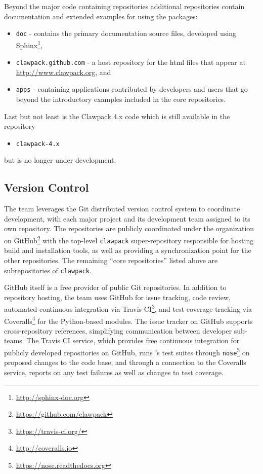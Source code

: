 Beyond the major code containing repositories additional repositories contain
documentation and extended examples for using the packages:
\begin{itemize}
    \item \texttt{doc} - contains the primary documentation source files,
    developed using
Sphinx\footnote{\url{http://sphinx-doc.org}},
    \item \texttt{clawpack.github.com} - a host repository for the html files
    that appear at \url{http://www.clawpack.org}, and
    \item \texttt{apps} - containing applications contributed by developers and
    users that go beyond the introductory examples included in the core
    repositories.
\end{itemize}
Last but not least is the Clawpack 4.x code which is still available in the
repository
\begin{itemize}
    \item \texttt{clawpack-4.x}
\end{itemize}
but is no longer under development.


\subsection{Version Control}

The \clawpack team leverages the Git distributed version control system
to coordinate development, with each major project and its development
team assigned to its own repository.  The repositories are 
publicly coordinated under the \clawpack organization on
GitHub\footnote{\url{https://github.com/clawpack}} with the
top-level \texttt{clawpack} super-repository responsible for hosting
build and installation tools, as well as providing a synchronization
point for the other repositories.  The remaining ``core \clawpack repositories''
listed above are subrepositories of \texttt{clawpack}.

GitHub itself is a free provider of public Git repositories.  In addition to
repository hosting, the \clawpack team uses GitHub for issue tracking,
code review, automated continuous integration via Travis CI\footnote{\url{https://travis-ci.org/}},
and test coverage tracking via Coveralls\footnote{\url{http://coveralls.io}}
for the Python-based modules.  The issue tracker on
GitHub supports cross-repository references,
simplifying communication between \clawpack developer sub-teams.  The
Travis CI service, which provides free continuous integration for
publicly developed repositories on GitHub, runs \clawpack's test
suites through \texttt{nose}\footnote{\url{https://nose.readthedocs.org}}
on proposed changes
to the code base, and through a connection to the Coveralls service,
reports on any test failures as well as changes to test coverage.

